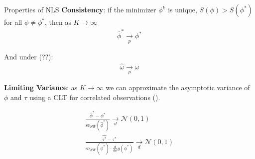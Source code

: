 \documentclass[12pt]{beamer}
\begin{document}
\begin{frame}{Properties of NLS}
\footnotesize
\textbf{Consistency}: if the minimizer $\phi^k$ is unique, $S(\phi) > S(\phi^*)$ for all $\phi \ne \phi^*$, then as $K\to\infty$
\begin{align}
\hat \phi^* \underset{p}{\to} \phi^*
\end{align}

And under (??):\\
\begin{align}
\hat \omega \underset{p}{\to} \omega
\end{align}

\textbf{Limiting Variance}: as $K\to\infty$ we can approximate the asymptotic variance of $\phi$ and $\tau$ using a CLT for correlated observations (\cite{hansen_econometrics_2022}).

\begin{align}
\frac{\hat\phi^* - \phi^*}{\text{se}_{NW}(\hat\phi^*)} \underset{d}{\to} \mathcal{N}(0, 1)\\
\frac{\hat{\tau^*} - \tau^*}{\text{se}_{NW}(\hat{\phi^*}) \cdot \frac{d}{d\phi}g(\phi^*)} \underset{d}{\to} \mathcal{N}(0,1)
\end{align}
\end{frame}
\end{document}
